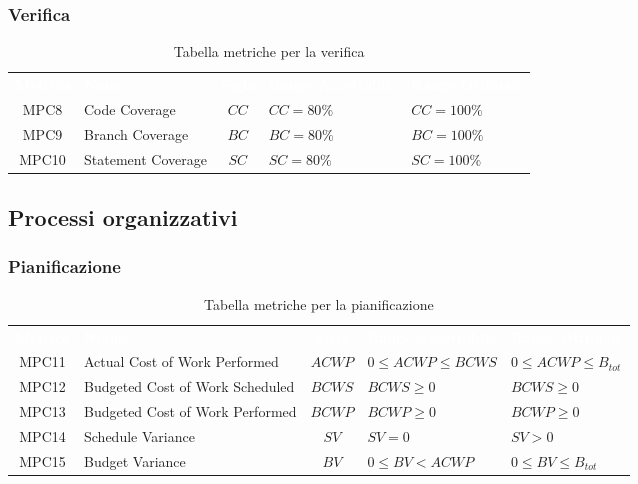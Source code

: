 \subsubsection{Verifica}
    \renewcommand{\arraystretch}{1.5}
    \begin{longtable}{ c C{4cm} c C{3.5cm} C{3.5cm}}
    	\caption{Tabella metriche per la verifica}\\
    	\textcolor{white}{\textbf{Metrica}} & \textcolor{white}{\textbf{Nome}} & \textcolor{white}{\textbf{Sigla}} & \textcolor{white}{\textbf{Range Accettabile}} & \textcolor{white}{\textbf{Range Ottimale}}\\
		MPC8 & Code Coverage & $CC$ & $CC = 80\%$ & $CC = 100\%$  \\
		MPC9 & Branch Coverage & $BC$ & $BC = 80\%$ & $BC = 100\%$  \\
		MPC10 & Statement Coverage & $SC$ & $SC = 80\%$ & $SC = 100\%$  \\
    \end{longtable}
\vspace{0.3cm}
\subsection{Processi organizzativi}

\subsubsection{Pianificazione}
\renewcommand{\arraystretch}{1.5}
\begin{longtable}{ c C{4cm} c C{3.5cm} C{3.5cm}}
	\caption{Tabella metriche per la pianificazione}\\
	\textcolor{white}{\textbf{Metrica}} & \textcolor{white}{\textbf{Nome}} & \textcolor{white}{\textbf{Sigla}} & \textcolor{white}{\textbf{Range Accettabile}} & \textcolor{white}{\textbf{Range Ottimale}}\\
		MPC11 & Actual Cost of Work Performed & $ACWP$ & $0 \leq ACWP \leq BCWS$ & $0 \leq ACWP \leq B_{tot}$ \\
		MPC12 & Budgeted Cost of Work Scheduled & $BCWS$ & $BCWS \geq 0$ &  $BCWS \geq 0$ \\
		MPC13 & Budgeted Cost of Work Performed & $BCWP$ & $BCWP \geq 0$ & $BCWP \geq 0$ \\
		MPC14 & Schedule Variance & $SV$ & $SV = 0$ & $SV > 0$  \\
		MPC15 & Budget Variance & $BV$ & $0 \leq BV < ACWP$ & $0 \leq BV \leq B_{tot}$  \\
	\end{longtable}
